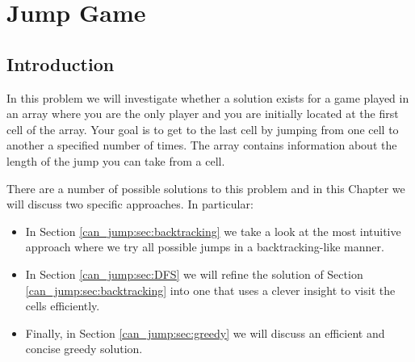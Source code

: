 %

\chapter{Jump Game}
\label{ch:can_jump}
\section*{Introduction}
In this problem we will investigate whether a solution exists for a game played in an array
where you are the only player and you are initially located at the first cell of the array. Your goal is to
get to the last cell by jumping from one cell to another a specified number of times. The array contains
information about the length of the jump you can take from a cell. 

There are a number of possible solutions to this problem and in this Chapter we will discuss two specific approaches. In particular:
\begin{itemize}
	\item In Section \ref{can_jump:sec:backtracking} we take a look at the most intuitive approach where we try all possible jumps in a backtracking-like manner.
	\item In Section \ref{can_jump:sec:DFS} we will refine the solution of Section
	\ref{can_jump:sec:backtracking} into one that uses a clever insight to visit the
	cells efficiently. 
	\item Finally, in Section \ref{can_jump:sec:greedy} we will discuss an efficient and concise
	greedy solution.
\end{itemize}


